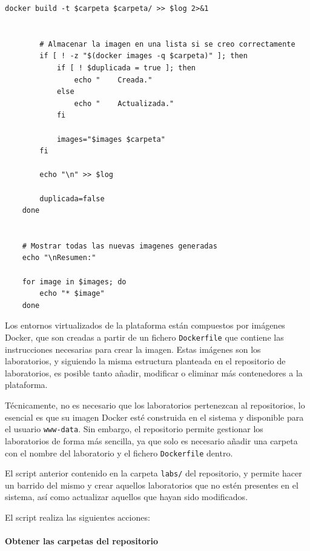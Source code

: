 \begin{appendices}
\begin{lstlisting}[style=bash_style, basicstyle=\ttfamily\scriptsize]
        docker build -t $carpeta $carpeta/ >> $log 2>&1
    
    
        # Almacenar la imagen en una lista si se creo correctamente
        if [ ! -z "$(docker images -q $carpeta)" ]; then
            if [ ! $duplicada = true ]; then
                echo "    Creada."
            else
                echo "    Actualizada."
            fi
    
            images="$images $carpeta"
        fi
    
        echo "\n" >> $log
    
        duplicada=false
    done
    
    
    # Mostrar todas las nuevas imagenes generadas
    echo "\nResumen:"
    
    for image in $images; do
        echo "* $image"
    done
                \end{lstlisting}

            \newpage

            Los entornos virtualizados de la plataforma están compuestos por imágenes Docker, que son creadas a partir de un fichero \texttt{Dockerfile} que contiene las instrucciones necesarias para crear la imagen. Estas imágenes son los laboratorios, y siguiendo la misma estructura planteada en el repositorio de laboratorios, es posible tanto añadir, modificar o eliminar más contenedores a la plataforma.

            Técnicamente, no es necesario que los laboratorios pertenezcan al repositorios, lo esencial es que su imagen Docker esté construida en el sistema y disponible para el usuario \texttt{www-data}. Sin embargo, el repositorio permite gestionar los laboratorios de forma más sencilla, ya que solo es necesario añadir una carpeta con el nombre del laboratorio y el fichero \texttt{Dockerfile} dentro.

            El script anterior contenido en la carpeta \texttt{labs/} del repositorio, y permite hacer un barrido del mismo y crear aquellos laboratorios que no estén presentes en el sistema, así como actualizar aquellos que hayan sido modificados.
            
            El script realiza las siguientes acciones:

            \paragraph{Obtener las carpetas del repositorio}
            

\end{appendices}
